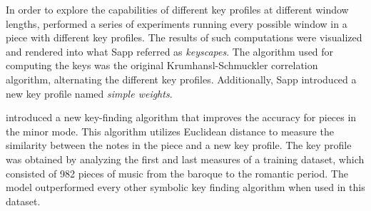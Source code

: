 




In order to explore the capabilities of different key
profiles at different window lengths,
\textcite{sapp2011computational} performed a series of
experiments running every possible window in a piece with
different key profiles. The results of such computations
were visualized and rendered into what Sapp referred as
\emph{keyscapes}. The algorithm used for computing the keys
was the original Krumhansl-Schmuckler correlation algorithm,
alternating the different key profiles. Additionally, Sapp
introduced a new key profile named \emph{simple weights}.

\textcite{albrecht2013use} introduced a new key-finding
algorithm that improves the accuracy for pieces in the minor
mode. This algorithm utilizes Euclidean distance to measure
the similarity between the notes in the piece and a new key
profile. The key profile was obtained by analyzing the first
and last measures of a training dataset, which consisted of
982 pieces of music from the baroque to the romantic period.
The model outperformed every other symbolic key finding
algorithm when used in this dataset.

